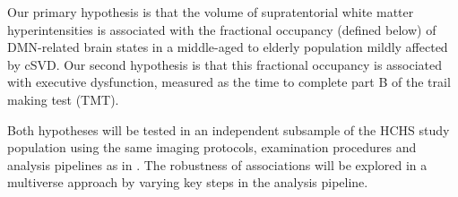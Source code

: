 Our primary hypothesis is that the volume of supratentorial white matter hyperintensities is associated with the fractional occupancy (defined below) of DMN-related brain states in a middle-aged to elderly population mildly affected by cSVD.
Our second hypothesis is that this fractional occupancy is associated with executive dysfunction, measured as the time to complete part B of the trail making test (TMT).

Both hypotheses will be tested in an independent subsample of the HCHS study population using the same imaging protocols, examination procedures and analysis pipelines as in \citep{Schlemm2022-he}.
The robustness of associations will be explored in a multiverse approach by varying key steps in the analysis pipeline.
